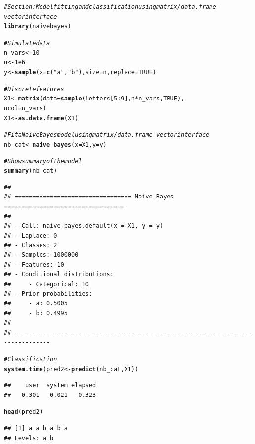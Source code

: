 \documentclass{article}\usepackage[]{graphicx}\usepackage[]{xcolor}
\makeatletter
\newcommand{\hlnum}[1]{\textcolor[rgb]{0.686,0.059,0.569}{#1}}%
\newcommand{\hlstr}[1]{\textcolor[rgb]{0.192,0.494,0.8}{#1}}%
\newcommand{\hlcom}[1]{\textcolor[rgb]{0.678,0.584,0.686}{\textit{#1}}}%
\newcommand{\hlopt}[1]{\textcolor[rgb]{0,0,0}{#1}}%
\newcommand{\hlstd}[1]{\textcolor[rgb]{0.345,0.345,0.345}{#1}}%
\newcommand{\hlkwb}[1]{\textcolor[rgb]{0.69,0.353,0.396}{#1}}%
\newcommand{\hlkwc}[1]{\textcolor[rgb]{0.333,0.667,0.333}{#1}}%
\newcommand{\hlkwd}[1]{\textcolor[rgb]{0.737,0.353,0.396}{\textbf{#1}}}%
\newenvironment{kframe}{%
 \def\at@end@of@kframe{}%
 \ifinner\ifhmode%
  \def\at@end@of@kframe{\end{minipage}}%
  \begin{minipage}{\columnwidth}%
 \fi\fi%
 \def\FrameCommand##1{\hskip\@totalleftmargin \hskip-\fboxsep
 \colorbox{shadecolor}{##1}\hskip-\fboxsep
     \hskip-\linewidth \hskip-\@totalleftmargin \hskip\columnwidth}%
 \MakeFramed {\advance\hsize-\width
   \@totalleftmargin\z@ \linewidth\hsize
   \@setminipage}}%
 {\par\unskip\endMakeFramed%
 \at@end@of@kframe}
\newenvironment{knitrout}{}{} %
\makeatother
\begin{document}
\begin{knitrout}
\color{fgcolor}\begin{kframe}
\begin{alltt}
\hlcom{# Section: Model fitting and classification using matrix/data.frame - vector interface}
\hlkwd{library}\hlstd{(naivebayes)}

\hlcom{# Simulate data}
\hlstd{n_vars} \hlkwb{<-} \hlnum{10}
\hlstd{n} \hlkwb{<-} \hlnum{1e6}
\hlstd{y} \hlkwb{<-} \hlkwd{sample}\hlstd{(}\hlkwc{x} \hlstd{=} \hlkwd{c}\hlstd{(}\hlstr{"a"}\hlstd{,} \hlstr{"b"}\hlstd{),} \hlkwc{size} \hlstd{= n,} \hlkwc{replace} \hlstd{=} \hlnum{TRUE}\hlstd{)}

\hlcom{# Discrete features}
\hlstd{X1} \hlkwb{<-} \hlkwd{matrix}\hlstd{(}\hlkwc{data} \hlstd{=} \hlkwd{sample}\hlstd{(letters[}\hlnum{5}\hlopt{:}\hlnum{9}\hlstd{], n} \hlopt{*} \hlstd{n_vars,} \hlnum{TRUE}\hlstd{),}
             \hlkwc{ncol} \hlstd{= n_vars)}
\hlstd{X1} \hlkwb{<-} \hlkwd{as.data.frame}\hlstd{(X1)}

\hlcom{# Fit a Naive Bayes model using matrix/data.frame - vector interface}
\hlstd{nb_cat} \hlkwb{<-} \hlkwd{naive_bayes}\hlstd{(}\hlkwc{x} \hlstd{= X1,} \hlkwc{y} \hlstd{= y)}

\hlcom{# Show summary of the model}
\hlkwd{summary}\hlstd{(nb_cat)}
\end{alltt}
\begin{verbatim}
## 
## ================================= Naive Bayes ================================== 
##  
## - Call: naive_bayes.default(x = X1, y = y) 
## - Laplace: 0 
## - Classes: 2 
## - Samples: 1000000 
## - Features: 10 
## - Conditional distributions: 
##     - Categorical: 10
## - Prior probabilities: 
##     - a: 0.5005
##     - b: 0.4995
## 
## --------------------------------------------------------------------------------
\end{verbatim}
\begin{alltt}
\hlcom{# Classification}
\hlkwd{system.time}\hlstd{(pred2} \hlkwb{<-} \hlkwd{predict}\hlstd{(nb_cat, X1))}
\end{alltt}
\begin{verbatim}
##    user  system elapsed 
##   0.301   0.021   0.323
\end{verbatim}
\begin{alltt}
\hlkwd{head}\hlstd{(pred2)}
\end{alltt}
\begin{verbatim}
## [1] a a b a b a
## Levels: a b
\end{verbatim}
\end{kframe}
\end{knitrout}
\end{document}
